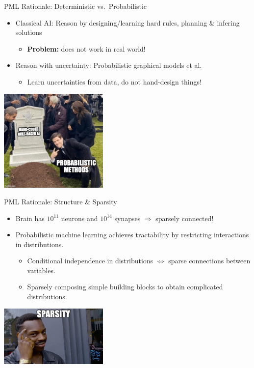 \begin{frame}{PML Rationale: Deterministic vs.\ Probabilistic}
    \begin{itemize}
    \pause \item Classical AI: Reason by designing/learning hard rules, planning \& infering solutions 
    \begin{itemize}
        \pause \item \textbf{Problem:} does not work in real world!
    \end{itemize}
    \pause \item Reason with uncertainty: Probabilistic graphical models et al.
    \begin{itemize}
    \pause \item Learn uncertainties from data, do not hand-design things!
    \end{itemize}
\end{itemize}
\begin{center}
\includegraphics[width=0.4\textwidth]{img/prob_cs_classical_ai.jpeg}
\end{center}
\end{frame}
%
\begin{frame}{PML Rationale: Structure \& Sparsity}
\begin{itemize}
\item Brain has $10^{11}$ neurons and $10^{14}$ synapses \pause $\Rightarrow$ sparsely connected!
\pause \item Probabilistic machine learning achieves tractability by restricting interactions in distributions.
\begin{itemize}
\pause \item Conditional independence in distributions $\Leftrightarrow$ sparse connections between variables.
\pause \item Sparsely composing simple building blocks to obtain complicated distributions.
\end{itemize}
\end{itemize}
\pause
\begin{center}
\includegraphics[width=0.4\textwidth]{img/sparse_connections.jpeg}
\end{center}
\end{frame}

